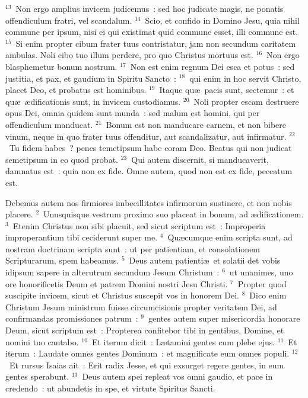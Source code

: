 ${}^{13}$~Non ergo amplius invicem judicemus~: sed hoc judicate magis, ne ponatis offendiculum fratri, vel scandalum.
${}^{14}$~Scio, et confido in Domino Jesu, quia nihil commune per ipsum, nisi ei qui existimat quid commune esset, illi commune est.
${}^{15}$~Si enim propter cibum frater tuus contristatur, jam non secundum caritatem ambulas. Noli cibo tuo illum perdere, pro quo Christus mortuus est.
${}^{16}$~Non ergo blasphemetur bonum nostrum.
${}^{17}$~Non est enim regnum Dei esca et potus~: sed justitia, et pax, et gaudium in Spiritu Sancto~:
${}^{18}$~qui enim in hoc servit Christo, placet Deo, et probatus est hominibus.
${}^{19}$~Itaque qu\ae\ pacis sunt, sectemur~: et qu\ae\ \ae dificationis sunt, in invicem custodiamus.
${}^{20}$~Noli propter escam destruere opus Dei, omnia quidem sunt munda~: sed malum est homini, qui per offendiculum manducat.
${}^{21}$~Bonum est non manducare carnem, et non bibere vinum, neque in quo frater tuus offenditur, aut scandalizatur, aut infirmatur.
${}^{22}$~Tu fidem habes~? penes temetipsum habe coram Deo. Beatus qui non judicat semetipsum in eo quod probat.
${}^{23}$~Qui autem discernit, si manducaverit, damnatus est~: quia non ex fide. Omne autem, quod non est ex fide, peccatum est.

\lettrine[lines=10,image=true,loversize=0.05,lraise=-0.03]{D}{}ebemus autem nos firmiores imbecillitates infirmorum sustinere, et non nobis placere.
${}^{2}$~Unusquisque vestrum proximo suo placeat in bonum, ad \ae dificationem.
${}^{3}$~Etenim Christus non sibi placuit, sed sicut scriptum est~: Improperia improperantium tibi ceciderunt super me.
${}^{4}$~Qu\ae cumque enim scripta sunt, ad nostram doctrinam scripta sunt~: ut per patientiam, et consolationem Scripturarum, spem habeamus.
${}^{5}$~Deus autem patienti\ae\ et solatii det vobis idipsum sapere in alterutrum secundum Jesum Christum~:
${}^{6}$~ut unanimes, uno ore honorificetis Deum et patrem Domini nostri Jesu Christi.
${}^{7}$~Propter quod suscipite invicem, sicut et Christus suscepit vos in honorem Dei.
${}^{8}$~Dico enim Christum Jesum ministrum fuisse circumcisionis propter veritatem Dei, ad confirmandas promissiones patrum~:
${}^{9}$~gentes autem super misericordia honorare Deum, sicut scriptum est~: Propterea confitebor tibi in gentibus, Domine, et nomini tuo cantabo.
${}^{10}$~Et iterum dicit~: L\ae tamini gentes cum plebe ejus.
${}^{11}$~Et iterum~: Laudate omnes gentes Dominum~: et magnificate eum omnes populi.
${}^{12}$~Et rursus Isaias ait~: Erit radix Jesse, et qui exsurget regere gentes, in eum gentes sperabunt.
${}^{13}$~Deus autem spei repleat vos omni gaudio, et pace in credendo~: ut abundetis in spe, et virtute Spiritus Sancti.


